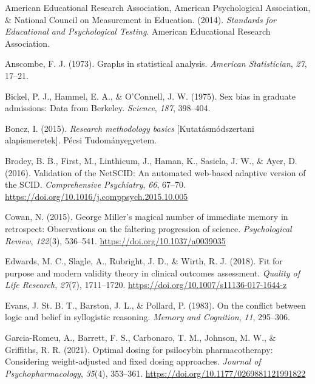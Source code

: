 \documentclass[
  11pt,
  a4paper,
  twoside,symmetric,openright]{book}
\newlength{\cslhangindent}
\newlength{\cslentryspacingunit} %
\newenvironment{CSLReferences}[2] %
 {%
  \setlength{\parindent}{0pt}
  \ifodd #1
  \let\oldpar\par
  \def\par{\hangindent=\cslhangindent\oldpar}
  \fi
  \setlength{\parskip}{#2\cslentryspacingunit}
 }%
 {}
\theoremstyle{break}
\theoremstyle{break}
\begin{document}
\hypertarget{refs}{}
\begin{CSLReferences}{1}{0}
\leavevmode{}%
American Educational Research Association, American Psychological Association, \& National Council on Measurement in Education. (2014). \emph{Standards for {Educational} and {Psychological Testing}}. {American Educational Research Association}.

\leavevmode{}%
Anscombe, F. J. (1973). Graphs in statistical analysis. \emph{American Statistician}, \emph{27}, 17--21.

\leavevmode{}%
Bickel, P. J., Hammel, E. A., \& O'Connell, J. W. (1975). Sex bias in graduate admissions: Data from {B}erkeley. \emph{Science}, \emph{187}, 398--404.

\leavevmode{}%
Boncz, I. (2015). \emph{{Research methodology basics}} {[}Kutatásmódszertani alapismeretek{]}. Pécsi Tudományegyetem.

\leavevmode{}%
Brodey, B. B., First, M., Linthicum, J., Haman, K., Sasiela, J. W., \& Ayer, D. (2016). Validation of the {NetSCID}: An automated web-based adaptive version of the {SCID}. \emph{Comprehensive Psychiatry}, \emph{66}, 67--70. \url{https://doi.org/10.1016/j.comppsych.2015.10.005}

\leavevmode{}%
Cowan, N. (2015). George {Miller}'s magical number of immediate memory in retrospect: {Observations} on the faltering progression of science. \emph{Psychological Review}, \emph{122}(3), 536--541. \url{https://doi.org/10.1037/a0039035}

\leavevmode{}%
Edwards, M. C., Slagle, A., Rubright, J. D., \& Wirth, R. J. (2018). Fit for purpose and modern validity theory in clinical outcomes assessment. \emph{Quality of Life Research}, \emph{27}(7), 1711--1720. \url{https://doi.org/10.1007/s11136-017-1644-z}

\leavevmode{}%
Evans, J. St. B. T., Barston, J. L., \& Pollard, P. (1983). On the conflict between logic and belief in syllogistic reasoning. \emph{Memory and Cognition}, \emph{11}, 295--306.

\leavevmode{}%
Garcia-Romeu, A., Barrett, F. S., Carbonaro, T. M., Johnson, M. W., \& Griffiths, R. R. (2021). Optimal dosing for psilocybin pharmacotherapy: {Considering} weight-adjusted and fixed dosing approaches. \emph{Journal of Psychopharmacology}, \emph{35}(4), 353--361. \url{https://doi.org/10.1177/0269881121991822}


\end{CSLReferences}
\end{document}

